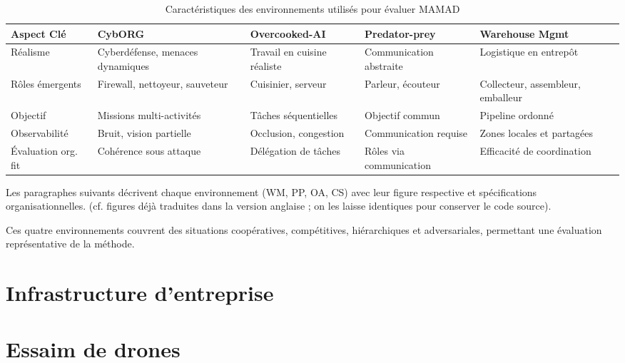 \begin{table}[h!]
    \centering
    \begin{footnotesize}
        \renewcommand{\arraystretch}{1.3}
        \begin{tabular}{p{2cm}p{2.2cm}p{2.2cm}p{2.2cm}p{2.2cm}}
            \hline
            \textbf{Aspect Clé} & \textbf{CybORG}                & \textbf{Overcooked-AI} & \textbf{Predator-prey} & \textbf{Warehouse Mgmt} \\ \hline
            Réalisme            & Cyberdéfense, menaces dynamiques & Travail en cuisine réaliste & Communication abstraite & Logistique en entrepôt \\ \hline
            Rôles émergents     & Firewall, nettoyeur, sauveteur & Cuisinier, serveur      & Parleur, écouteur       & Collecteur, assembleur, emballeur \\ \hline
            Objectif            & Missions multi-activités        & Tâches séquentielles    & Objectif commun         & Pipeline ordonné \\ \hline
            Observabilité       & Bruit, vision partielle         & Occlusion, congestion   & Communication requise   & Zones locales et partagées \\ \hline
            Évaluation org. fit & Cohérence sous attaque          & Délégation de tâches    & Rôles via communication & Efficacité de coordination \\ \hline
        \end{tabular}
        \caption{Caractéristiques des environnements utilisés pour évaluer \ac{MAMAD}}
        \label{tab:mamad_env_characteristics}
    \end{footnotesize}
\end{table}

Les paragraphes suivants décrivent chaque environnement (WM, PP, OA, CS) avec leur figure respective et spécifications organisationnelles. (cf. figures déjà traduites dans la version anglaise ; on les laisse identiques pour conserver le code source).

\bigskip

\noindent Ces quatre environnements couvrent des situations coopératives, compétitives, hiérarchiques et adversariales, permettant une évaluation représentative de la méthode.


\section{Infrastructure d'entreprise}
\section{Essaim de drones}
